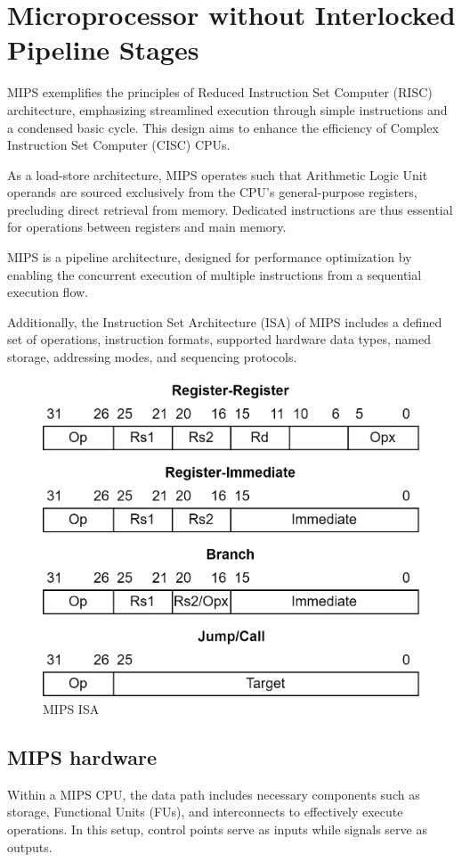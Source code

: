 \section{Microprocessor without Interlocked Pipeline Stages}

MIPS exemplifies the principles of Reduced Instruction Set Computer (RISC) architecture, emphasizing streamlined execution through simple instructions and a condensed basic cycle. 
This design aims to enhance the efficiency of Complex Instruction Set Computer (CISC) CPUs.

As a load-store architecture, MIPS operates such that Arithmetic Logic Unit operands are sourced exclusively from the CPU's general-purpose registers, precluding direct retrieval from memory. 
Dedicated instructions are thus essential for operations between registers and main memory.

MIPS is a pipeline architecture, designed for performance optimization by enabling the concurrent execution of multiple instructions from a sequential execution flow.

Additionally, the Instruction Set Architecture (ISA) of MIPS includes a defined set of operations, instruction formats, supported hardware data types, named storage, addressing modes, and sequencing protocols.
\begin{figure}[H]
    \centering
    \includegraphics[width=0.4\linewidth]{images/isa.png}
    \caption{MIPS ISA}
\end{figure}

\subsection{MIPS hardware}
Within a MIPS CPU, the data path includes necessary components such as storage, Functional Units (FUs), and interconnects to effectively execute operations. 
In this setup, control points serve as inputs while signals serve as outputs.

